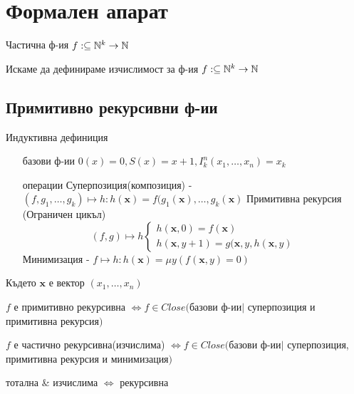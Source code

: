 \section{Формален апарат}
\begin{notation}
    Частична ф-ия $f: \subseteq {\mathbb{N}}^k \to {\mathbb{N}}$
\end{notation}
Искаме да дефинираме изчислимост за ф-ия $f: \subseteq {\mathbb{N}}^k \to {\mathbb{N}}$

\subsection{Примитивно рекурсивни ф-ии}
\begin{definition}
    Индуктивна дефиниция
    \begin{itemize}
        \item[базови ф-ии] $0(x) = 0, S(x) = x+1, I_k^n(x_1,\dots, x_n) = x_k$
        \item[операции] 
            \subitem Суперпозиция(композиция) - $(f, g_1, \dots, g_k) \mapsto h : h(\mathbf{x}) = f(g_1(\textbf{x}), \dots, g_k(\textbf{x})$
            \subitem Примитивна рекурсия (Ограничен цикъл)
            \begin{equation}
            (f, g) \mapsto h
                \begin{cases}
                    h(\textbf{x}, 0) = f(\textbf{x})\\
                    h(\textbf{x}, y+1) = g(\textbf{x}, y, h(\textbf{x}, y)
                \end{cases}
            \end{equation}
            \subitem Минимизация - $f \mapsto h : h(\textbf{x}) = \mu y(f(\textbf{x}, y) = 0)$
    \end{itemize}
    Където $\textbf{x}$ е вектор $(x_1, \dots, x_n)$

    $f$ е примитивно рекурсивна $\iff f\in Close($базови ф-ии$ \mid $ суперпозиция и примитивна рекурсия$)$ 
\end{definition}
\begin{definition}
    $f$ е частично рекурсивна(изчислима) $\iff f\in Close($базови ф-ии$ \mid $ суперпозиция, примитивна рекурсия и минимизация$)$ 
\end{definition}
\begin{definition}
    тотална \& изчислима $\iff$ рекурсивна
\end{definition}

